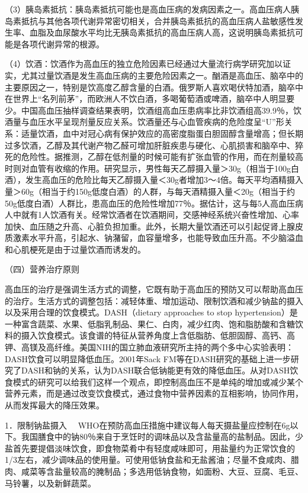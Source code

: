 （3）胰岛素抵抗：胰岛素抵抗可能也是高血压病的发病因素之一。高血压病人胰岛素抵抗与其他各项代谢异常密切相关，合并胰岛素抵抗的高血压病人盐敏感性发生率、血脂及血尿酸水平均比无胰岛素抵抗的高血压病人高，这说明胰岛素抵抗可能是各项代谢异常的根源。

（4）饮酒：饮酒作为高血压的独立危险因素已经通过大量流行病学研究加以证实，尤其过量饮酒是发生高血压病的主要危险因素之一。酗酒是高血压、脑卒中的主要原因之一，特别是饮高度乙醇含量的白酒。俄罗斯人喜欢喝伏特加酒，脑卒中在世界上“名列前茅”，而欧洲人不饮白酒，多喝葡萄酒或啤酒，脑卒中人明显要少。中国高血压抽样调查结果表明，饮酒组高血压患病率比非饮酒组高39.9％，饮酒量与血压水平呈现剂量反应关系。饮酒量还与心血管疾病的危险度呈“U”形关系：适量饮酒，血中对冠心病有保护效应的高密度脂蛋白胆固醇含量增高；但长期过多饮酒，乙醇及其代谢产物乙醛可增加肝脏疾患与硬化、心肌损害和脑卒中、猝死的危险性。据推测，乙醇在低剂量的时候可能有扩张血管的作用，而在剂量较高时则对血管有收缩的作用。研究显示，男性每天乙醇摄入量＞30g（相当于100g白酒），发生高血压的危险比每天乙醇摄入量＜30g者增加3～4倍。每天平均酒精摄入量＞60g（相当于约150g低度白酒）的人群，与每天酒精摄入量＜20g（相当于约50g低度白酒）人群比，患高血压的危险性增加77％。据估计，这与每5人高血压病人中就有1人饮酒有关。经常饮酒者在饮酒期间，交感神经系统兴奋性增加、心率加快、血压随之升高、心脏负担加重。此外，长期大量饮酒还可以引起促肾上腺皮质激素水平升高，引起水、钠潴留，血容量增多，也能导致血压升高。不少脑溢血和心肌梗死是由于过量饮酒而诱发的。

（四）营养治疗原则

高血压的治疗是强调生活方式的调整，它既有助于高血压的预防又可以帮助高血压的治疗。生活方式的调整包括：减轻体重、增加运动、限制饮酒和减少钠盐的摄入以及采用合理的饮食模式。DASH（dietary
approaches to stop
hypertension）是一种富含蔬菜、水果、低脂乳制品、果仁、白肉，减少红肉、饱和脂肪酸和含糖饮料的摄入饮食模式。该食谱的特征从营养角度上含低脂肪、低胆固醇、高钙、高钾、高镁及高纤维。美国NIH的国立肺血液研究所主持的两个多中心实验表明：DASH饮食可以明显降低血压。2001年Sack
FM等在DASH研究的基础上进一步研究了DASH和钠的关系，认为DASH联合低钠能更有效的降低血压。从对DASH饮食模式的研究可以给我们这样一个观点，即控制高血压不是单纯的增加或减少某个营养元素，而是通过改变饮食模式，通过食物中营养因素的互相影响，协同作用，从而发挥最大的降压效果。

{1．限制钠盐摄入}
　WHO在预防高血压措施中建议每人每天摄盐量应控制在6g以下。我国膳食中的钠80％来自于烹饪时的调味品以及含盐量高的盐制品。因此，少盐首先要提倡淡味饮食，即食物菜肴中有轻度咸味即可，用盐量约为正常饮食的1/3左右，减少调味品的使用量。可使用低钠食盐和无盐酱油；尽量不食咸肉、腊肉、咸菜等含盐量较高的腌制品；多选用低钠食物，如面粉、大豆、豆腐、毛豆、马铃薯，以及新鲜蔬菜。

